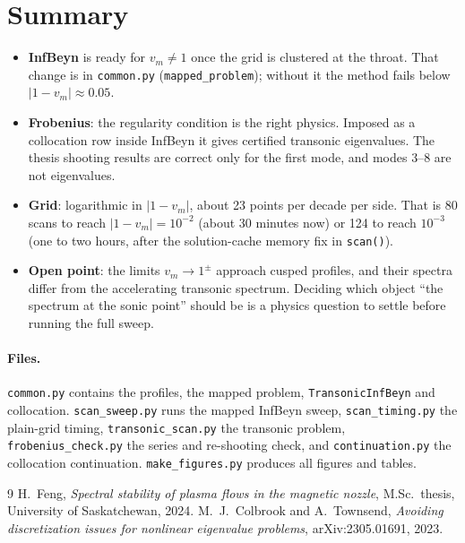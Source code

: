 \documentclass[11pt]{article}
\newcommand{\infbeyn}{InfBeyn}
\begin{document}
\section{Summary}
\begin{itemize}
  \item \textbf{\infbeyn{}} is ready for $v_m\ne1$ once the grid is clustered at the throat. That change is
  in \texttt{common.py} (\texttt{mapped\_problem}); without it the method fails below $|1-v_m|\approx0.05$.
  \item \textbf{Frobenius}: the regularity condition is the right physics. Imposed as a collocation row inside
  \infbeyn{} it gives certified transonic eigenvalues. The thesis shooting results are correct only for the first
  mode, and modes 3--8 are not eigenvalues.
  \item \textbf{Grid}: logarithmic in $|1-v_m|$, about 23 points per decade per side. That is 80 scans to reach
  $|1-v_m|=10^{-2}$ (about 30 minutes now) or 124 to reach $10^{-3}$ (one to two hours, after the solution-cache
  memory fix in \texttt{scan()}).
  \item \textbf{Open point}: the limits $v_m\to1^\pm$ approach cusped profiles, and their spectra differ from
  the accelerating transonic spectrum. Deciding which object ``the spectrum at the sonic point'' should be
  is a physics question to settle before running the full sweep.
\end{itemize}

\paragraph{Files.} \texttt{common.py} contains the profiles, the mapped problem, \texttt{TransonicInfBeyn} and
collocation. \texttt{scan\_sweep.py} runs the mapped \infbeyn{} sweep, \texttt{scan\_timing.py} the plain-grid
timing, \texttt{transonic\_scan.py} the transonic problem, \texttt{frobenius\_check.py} the series and
re-shooting check, and \texttt{continuation.py} the collocation continuation. \texttt{make\_figures.py}
produces all figures and tables.

\begin{thebibliography}{9}
 H.~Feng, \emph{Spectral stability of plasma flows in the magnetic nozzle}, M.Sc.\ thesis,
University of Saskatchewan, 2024.
 M.~J.~Colbrook and A.~Townsend, \emph{Avoiding discretization issues for nonlinear
eigenvalue problems}, arXiv:2305.01691, 2023.
\end{thebibliography}
\end{document}
